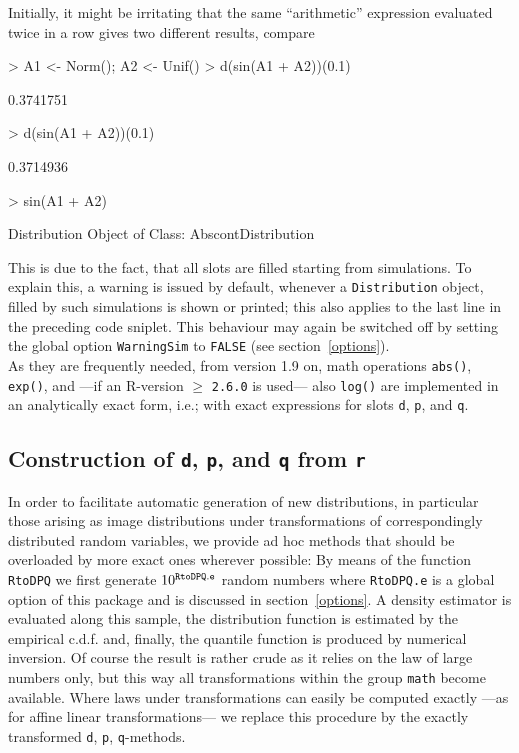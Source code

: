 \documentclass[11pt]{article}
\newcommand{\code}[1]{{\tt #1}}
\begin{document}
Initially, it might be irritating that the same ``arithmetic'' expression
evaluated twice in a row gives two different results, compare
\begin{Schunk}
\begin{Sinput}
>   A1 <- Norm(); A2 <- Unif()
>   d(sin(A1 + A2))(0.1)
\end{Sinput}
\begin{Soutput}
[1] 0.3741751
\end{Soutput}
\begin{Sinput}
>   d(sin(A1 + A2))(0.1)
\end{Sinput}
\begin{Soutput}
[1] 0.3714936
\end{Soutput}
\begin{Sinput}
>   sin(A1 + A2)
\end{Sinput}
\begin{Soutput}
Distribution Object of Class: AbscontDistribution
\end{Soutput}
\end{Schunk}
This is due to the fact, that all slots are filled starting from simulations.
To explain this, a warning is issued  by default, whenever a \code{Distribution}
object, filled by such simulations is shown or printed; this also applies to the 
last line in the preceding code sniplet. This behaviour may again be switched 
off by setting the global option
\code{WarningSim} to \code{FALSE} (see section~\ref{options}).\\

As they are frequently needed, from version 1.9 on, math operations 
\code{abs()}, \code{exp()}, and ---if an {\sf R}-version $\ge$ {\tt 2.6.0} is 
used--- also \code{log()} are implemented in an analytically exact form, 
i.e.; with exact expressions for slots \code{d}, \code{p}, and \code{q}.

%
\subsection{Construction of \code{d}, \code{p}, and \code{q} from \code{r}}
%
In order to facilitate automatic generation of new distributions, in particular 
those arising as image distributions under transformations of correspondingly 
distributed random variables, we provide ad hoc methods that should be 
overloaded by more exact ones wherever possible: By means of the function 
\code{RtoDPQ} we first generate $10^{\footnotesize\tt RtoDPQ.e}$
random numbers where \code{RtoDPQ.e} is a global option of this package and is 
discussed in section~{\ref{options}}. %
A density estimator is evaluated along this sample, the distribution function is 
estimated by the empirical c.d.f. and, finally, the quantile function is 
produced by numerical inversion.
Of course the result is rather crude as it relies on the law of large numbers 
only, but this way all transformations within the group \code{math} become 
available.
Where laws under transformations can easily be computed exactly ---as for affine
linear transformations--- we replace this procedure by the exactly transformed
\code{d}, \code{p}, \code{q}-methods.
%
\end{document}
